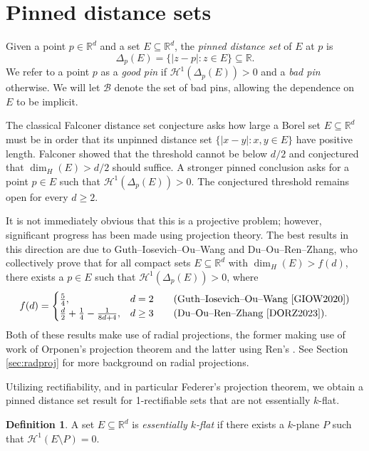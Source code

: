 \documentclass[12pt]{amsart}
\theoremstyle{definition}
\newtheorem{definition}[theorem]{Definition}
\numberwithin{equation}{section}
\newcommand{\R}{\mathbb{R}}
\begin{document}
\section{Pinned distance sets}\label{sec:pinneddistance}

Given a point $p \in \mathbb{R}^d$ and a set $E\subseteq \mathbb{R}^d$, the \emph{pinned distance set} of $E$ at $p$ is 
$$\Delta_p(E) = \{|z - p| : z \in E\} \subseteq \R.$$
We refer to a point $p$ as a \emph{good pin} if $\mathcal H^1(\Delta_p(E)) > 0$ and a \emph{bad pin} otherwise. We will let $\mathcal{B}$ denote the set of bad pins, allowing the dependence on $E$ to be implicit.

The classical Falconer distance set conjecture asks how large a Borel set $E\subseteq\mathbb{R}^d$ must be in order that its unpinned distance set $\{|x-y|:x,y\in E\}$ have positive length. Falconer \cite{Falconer1985} showed that the threshold cannot be below $d/2$ and conjectured that $\dim_H(E)>d/2$ should suffice. A stronger pinned conclusion asks for a point $p\in E$ such that $\mathcal H^1(\Delta_p(E)) >0$. The conjectured threshold remains open for every $d\geq2$. 

It is not immediately obvious that this is a projective problem; however, significant progress has been made using projection theory. The best results in this direction are due to Guth--Iosevich--Ou--Wang and Du--Ou--Ren--Zhang, who collectively prove that for all compact sets $E\subseteq \R^d$ with $\dim_H(E)> f(d)$, there exists a $p\in E$ such that $\mathcal H^1(\Delta_p(E))>0$, where
\[
f(d) = \begin{cases}
    \frac{5}{4}, & d=2 \quad \quad \text{(Guth--Iosevich--Ou--Wang \cite{GIOW2020})} \\
    \frac{d}{2} + \frac{1}{4} - \frac{1}{8d + 4}, & d\geq 3 \quad \quad \text{(Du--Ou--Ren--Zhang \cite{DORZ2023})}.
\end{cases}
\]
Both of these results make use of radial projections, the former making use of work of Orponen's projection theorem \cite{Orponen2019} and the latter using Ren's \cite{Ren2023}. See Section \ref{sec:radproj} for more background on radial projections. 

Utilizing rectifiability, and in particular Federer's projection theorem, we obtain a pinned distance set result for 1-rectifiable sets that are not essentially $k$-flat. 

\begin{definition}
    A set $E \subseteq \R^d$ is \emph{essentially $k$-flat} if there exists a $k$-plane $P$ such that $\mathcal H^1(E \setminus P) = 0$.
\end{definition}
\end{document}
